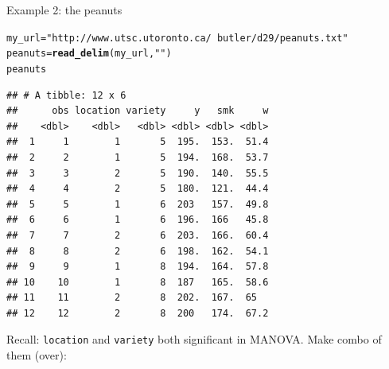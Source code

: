 \documentclass[unknownkeysallowed]{beamer}\usepackage[]{graphicx}\usepackage[]{color}
\makeatletter
\newcommand{\hlstr}[1]{\textcolor[rgb]{0.192,0.494,0.8}{#1}}%
\newcommand{\hlstd}[1]{\textcolor[rgb]{0.345,0.345,0.345}{#1}}%
\newcommand{\hlkwb}[1]{\textcolor[rgb]{0.69,0.353,0.396}{#1}}%
\newcommand{\hlkwd}[1]{\textcolor[rgb]{0.737,0.353,0.396}{\textbf{#1}}}%
\newenvironment{kframe}{%
 \def\at@end@of@kframe{}%
 \ifinner\ifhmode%
  \def\at@end@of@kframe{\end{minipage}}%
  \begin{minipage}{\columnwidth}%
 \fi\fi%
 \def\FrameCommand##1{\hskip\@totalleftmargin \hskip-\fboxsep
 \colorbox{shadecolor}{##1}\hskip-\fboxsep
     \hskip-\linewidth \hskip-\@totalleftmargin \hskip\columnwidth}%
 \MakeFramed {\advance\hsize-\width
   \@totalleftmargin\z@ \linewidth\hsize
   \@setminipage}}%
 {\par\unskip\endMakeFramed%
 \at@end@of@kframe}
\newenvironment{knitrout}{}{} %
\makeatother
\begin{document}
% 
%
%  
%
%  
%
%
%    
%  
%  

\begin{frame}[fragile]{Example 2: the peanuts}

\begin{knitrout}\footnotesize
{}\color{fgcolor}\begin{kframe}
\begin{alltt}
\hlstd{my_url}\hlkwb{=}\hlstr{"http://www.utsc.utoronto.ca/~butler/d29/peanuts.txt"}
\hlstd{peanuts}\hlkwb{=}\hlkwd{read_delim}\hlstd{(my_url,}\hlstr{" "}\hlstd{)}
\hlstd{peanuts}
\end{alltt}
\begin{verbatim}
## # A tibble: 12 x 6
##      obs location variety     y   smk     w
##    <dbl>    <dbl>   <dbl> <dbl> <dbl> <dbl>
##  1     1        1       5  195.  153.  51.4
##  2     2        1       5  194.  168.  53.7
##  3     3        2       5  190.  140.  55.5
##  4     4        2       5  180.  121.  44.4
##  5     5        1       6  203   157.  49.8
##  6     6        1       6  196.  166   45.8
##  7     7        2       6  203.  166.  60.4
##  8     8        2       6  198.  162.  54.1
##  9     9        1       8  194.  164.  57.8
## 10    10        1       8  187   165.  58.6
## 11    11        2       8  202.  167.  65  
## 12    12        2       8  200   174.  67.2
\end{verbatim}
\end{kframe}
\end{knitrout}

Recall: \texttt{location} and \texttt{variety} both significant in
MANOVA. Make combo of them (over):

  
\end{frame}
\end{document}

